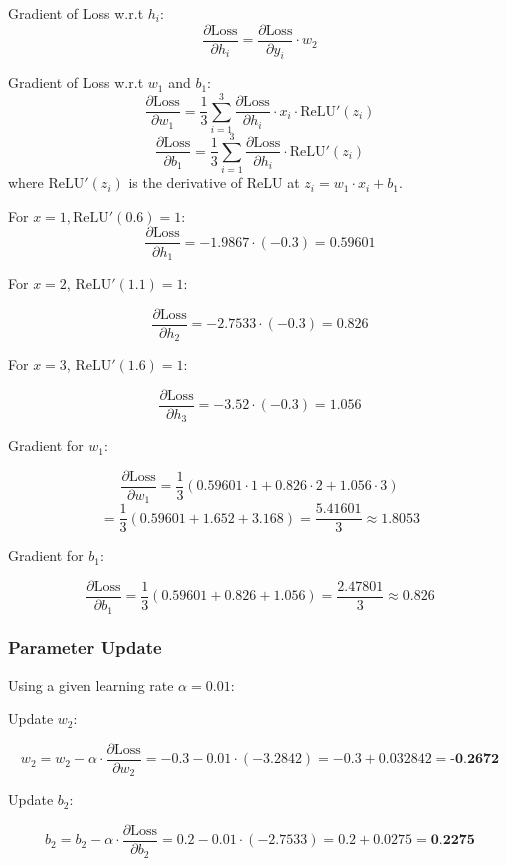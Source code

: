 \documentclass{article}
\begin{document}
Gradient of Loss w.r.t \( h_i \):
\[
\frac{\partial \text{Loss}}{\partial h_i} = \frac{\partial \text{Loss}}{\partial y_i} \cdot w_2
\]

Gradient of Loss w.r.t \( w_1 \) and \( b_1 \):
\[
\frac{\partial \text{Loss}}{\partial w_1} = \frac{1}{3} \sum_{i=1}^{3} \frac{\partial \text{Loss}}{\partial h_i} \cdot x_i \cdot \text{ReLU}'(z_i)
\]
\[
\frac{\partial \text{Loss}}{\partial b_1} = \frac{1}{3} \sum_{i=1}^{3} \frac{\partial \text{Loss}}{\partial h_i} \cdot \text{ReLU}'(z_i)
\]
where \( \text{ReLU}'(z_i) \) is the derivative of ReLU at \( z_i = w_1 \cdot x_i + b_1 \).

\vspace{5pt}
For \( x = 1, \text{ReLU}'(0.6) = 1 \):
\[
\frac{\partial \text{Loss}}{\partial h_1} = -1.9867 \cdot (-0.3) = 0.59601
\]

For \( x = 2 \), \( \text{ReLU}'(1.1) = 1 \):

\[
\frac{\partial \text{Loss}}{\partial h_2} = -2.7533 \cdot (-0.3) = 0.826
\]

For \( x = 3 \), \( \text{ReLU}'(1.6) = 1 \):

\[
\frac{\partial \text{Loss}}{\partial h_3} = -3.52 \cdot (-0.3) = 1.056
\]

Gradient for \( w_1 \):

\[
\frac{\partial \text{Loss}}{\partial w_1} = \frac{1}{3} (0.59601 \cdot 1 + 0.826 \cdot 2 + 1.056 \cdot 3)
\]
\[
= \frac{1}{3} (0.59601 + 1.652 + 3.168) = \frac{5.41601}{3} \approx 1.8053
\]

Gradient for \( b_1 \):

\[
\frac{\partial \text{Loss}}{\partial b_1} = \frac{1}{3} (0.59601 + 0.826 + 1.056) = \frac{2.47801}{3} \approx 0.826
\]

\subsubsection*{Parameter Update}

Using a given learning rate \( \alpha = 0.01 \):
\vspace{5pt}

Update \( w_2 \):

\[
w_2 = w_2 - \alpha \cdot \frac{\partial \text{Loss}}{\partial w_2} = -0.3 - 0.01 \cdot (-3.2842) = -0.3 + 0.032842 = \textbf{-0.2672}
\]

Update \( b_2 \):

\[
b_2 = b_2 - \alpha \cdot \frac{\partial \text{Loss}}{\partial b_2} = 0.2 - 0.01 \cdot (-2.7533) = 0.2 + 0.0275 = \textbf{0.2275}
\]
\end{document}
